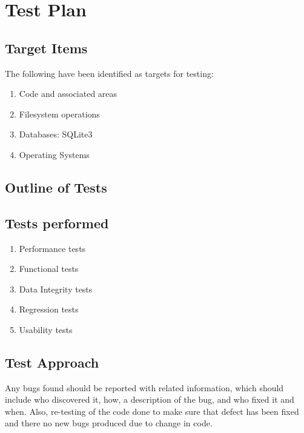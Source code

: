 \section{Test Plan}
\subsection{Target Items}
The following have been identified as targets for testing:
\begin{enumerate}
\item Code and associated areas
\item Filesystem operations
\item Databases: SQLite3
\item Operating Systems
\end{enumerate}

\subsection{Outline of Tests}
\subsection*{Tests performed}
\begin{enumerate}
\item Performance tests
\item Functional tests
\item Data Integrity tests
\item Regression tests
\item Usability tests
\end{enumerate}

\subsection{Test Approach}
Any bugs found should be reported with related information, which should include
who discovered it, how, a description of the bug, and who fixed it and
when. Also, re-testing of the code done to make sure that defect has been fixed
and there no new bugs produced due to change in code.

